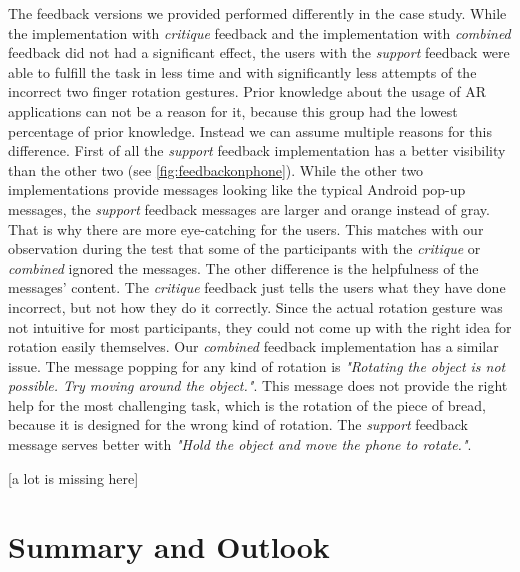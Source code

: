 \documentclass[11pt, a4paper]{article}
\begin{document}
			The feedback versions we provided performed differently in the case study. While the implementation with \emph{critique} feedback and the implementation with \emph{combined} feedback did not had a significant effect, the users with the \emph{support} feedback were able to fulfill the task in less time and with significantly less attempts of the incorrect two finger rotation gestures. Prior knowledge about the usage of \ac{AR} applications can not be a reason for it, because this group had the lowest percentage of prior knowledge. Instead we can assume multiple reasons for this difference. First of all the \emph{support} feedback implementation has a better visibility than the other two (see \ref{fig:feedbackonphone}). While the other two implementations provide messages looking like the typical Android pop-up messages, the \emph{support} feedback messages are larger and orange instead of gray. That is why there are more eye-catching for the users. This matches with our observation during the test that some of the participants with the \emph{critique} or \emph{combined} ignored the messages. The other difference is the helpfulness of the messages' content. The \emph{critique} feedback just tells the users what they have done incorrect, but not how they do it correctly. Since the actual rotation gesture was not intuitive for most participants, they could not come up with the right idea for rotation easily themselves. Our \emph{combined} feedback implementation has a similar issue. The message popping for any kind of rotation is \emph{"Rotating the object is not possible. Try moving around the object."}. This message does not provide the right help for the most challenging task, which is the rotation of the piece of bread, because it is designed for the wrong kind of rotation. The \emph{support} feedback message serves better with \emph{"Hold the object and move the phone to rotate."}.











			[a lot is missing here]

	\section*{Summary and Outlook}\label{sec:summary}
		\lipsum[2-3]

	\pagebreak
	\printbibliography
\restoregeometry
\end{document}
